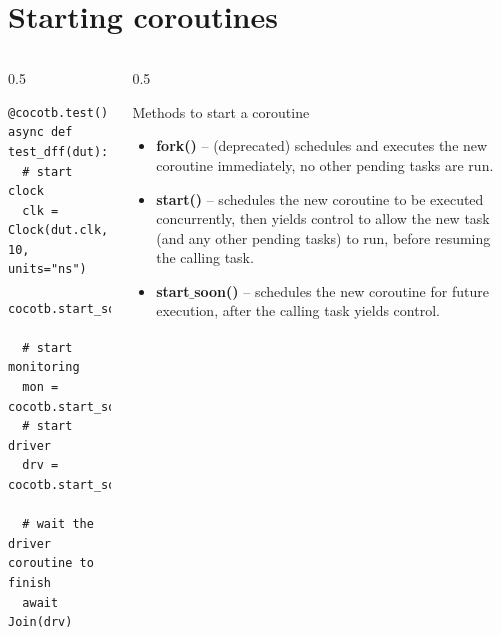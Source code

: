 \documentclass[aspectratio=169]{beamer}
\begin{document}
\section*{Starting coroutines}
\begin{frame}[fragile]{\secname}

  \begin{columns}
    \begin{column}{0.5\textwidth}
      
  \begin{verbatim}
@cocotb.test()
async def test_dff(dut):
  # start clock
  clk = Clock(dut.clk, 10, units="ns") 
  cocotb.start_soon(clk.start())

  # start monitoring 
  mon = cocotb.start_soon(dff_monitor(dut))
  # start driver
  drv = cocotb.start_soon(dff_driver(dut))
  
  # wait the driver coroutine to finish
  await Join(drv)
  \end{verbatim}
    \end{column}
    \begin{column}{0.5\textwidth}
      \begin{block}{Methods to start a coroutine}
         \begin{itemize}
           \item {\bf fork()} -- (deprecated) schedules and executes the new coroutine immediately, no other pending tasks are run. 
           \item {\bf start()} -- schedules the new coroutine to be executed concurrently, then yields control to allow the new task (and any other pending tasks) to run, before resuming the calling task.
            \item {\bf start$\_$soon()} -- schedules the new coroutine for future execution, after the calling task yields control.
         \end{itemize}
      \end{block}
      
    \end{column}
  \end{columns}
    
\end{frame}

\end{document}
